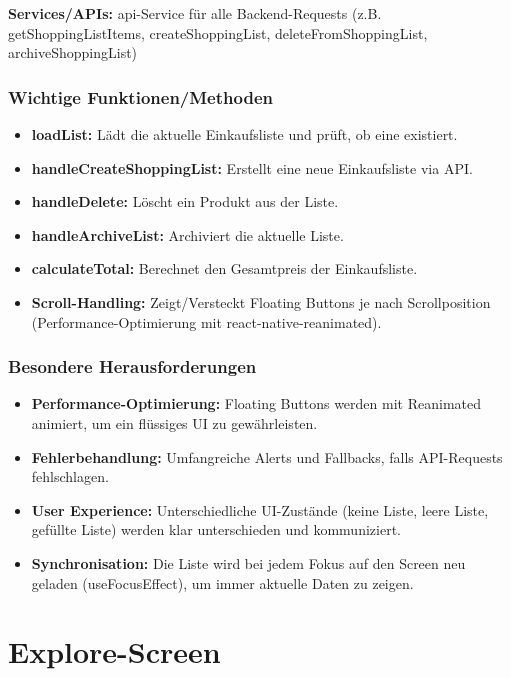 \documentclass[12pt, a4paper]{report} %
\begin{document}
\noindent\textbf{Services/APIs:}
api-Service für alle Backend-Requests (z.B. getShoppingListItems, createShoppingList, deleteFromShoppingList, archiveShoppingList)

\subsubsection{Wichtige Funktionen/Methoden}
\begin{itemize}
    \item \textbf{loadList:} Lädt die aktuelle Einkaufsliste und prüft, ob eine existiert.
    \item \textbf{handleCreateShoppingList:} Erstellt eine neue Einkaufsliste via API.
    \item \textbf{handleDelete:} Löscht ein Produkt aus der Liste.
    \item \textbf{handleArchiveList:} Archiviert die aktuelle Liste.
    \item \textbf{calculateTotal:} Berechnet den Gesamtpreis der Einkaufsliste.
    \item \textbf{Scroll-Handling:} Zeigt/Versteckt Floating Buttons je nach Scrollposition (Performance-Optimierung mit react-native-reanimated).
\end{itemize}

\subsubsection{Besondere Herausforderungen}
\begin{itemize}
    \item \textbf{Performance-Optimierung:} Floating Buttons werden mit Reanimated animiert, um ein flüssiges UI zu gewährleisten.
    \item \textbf{Fehlerbehandlung:} Umfangreiche Alerts und Fallbacks, falls API-Requests fehlschlagen.
    \item \textbf{User Experience:} Unterschiedliche UI-Zustände (keine Liste, leere Liste, gefüllte Liste) werden klar unterschieden und kommuniziert.
    \item \textbf{Synchronisation:} Die Liste wird bei jedem Fokus auf den Screen neu geladen (useFocusEffect), um immer aktuelle Daten zu zeigen.
\end{itemize}

\section{Explore-Screen}
\label{sec:explore_screen}
\end{document}
